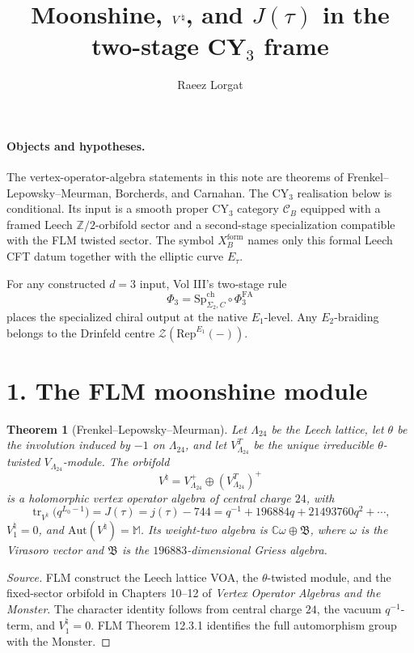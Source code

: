 \documentclass[11pt]{article}
\title{Moonshine, \(\Vnat\), and \(J(\tau)\) in the two-stage CY\(_3\) frame}
\author{Raeez Lorgat}
\date{}
\providecommand{\Z}{\mathbb{Z}}
\providecommand{\C}{\mathbb{C}}
\providecommand{\Leech}{\Lambda_{24}}
\providecommand{\Vnat}{V^{\natural}}
\providecommand{\VLam}{V_{\Leech}}
\providecommand{\Mon}{\mathbb{M}}
\providecommand{\Aut}{\mathrm{Aut}}
\providecommand{\SpCh}{\mathrm{Sp}^{\mathrm{ch}}}
\providecommand{\PhiFA}{\Phi^{\mathrm{FA}}}
\providecommand{\Tr}{\operatorname{tr}}
\providecommand{\Rep}{\mathrm{Rep}}
\theoremstyle{plain}
\newtheorem{theorem}{Theorem}
\theoremstyle{definition}
\begin{document}
\maketitle

\paragraph{Objects and hypotheses.}
The vertex-operator-algebra statements in this note are theorems of
Frenkel--Lepowsky--Meurman, Borcherds, and Carnahan. The CY\(_3\)
realisation below is conditional. Its input is a smooth proper CY\(_3\)
category \(\mathcal C_B\) equipped with a framed Leech
\(\Z/2\)-orbifold sector and a second-stage specialization compatible
with the FLM twisted sector. The symbol \(X_B^{\mathrm{form}}\) names
only this formal Leech CFT datum together with the elliptic curve
\(E_\tau\).

For any constructed \(d=3\) input, Vol III's two-stage rule
\[
  \Phi_3=\SpCh_{\Sigma_2,C}\circ\PhiFA_3
\]
places the specialized chiral output at the native \(E_1\)-level. Any
\(E_2\)-braiding belongs to the Drinfeld centre
\(\mathcal Z(\Rep^{E_1}(-))\).

\section*{1. The FLM moonshine module}

\begin{theorem}[Frenkel--Lepowsky--Meurman]
\label{thm:flm-vnatural}
Let \(\Leech\) be the Leech lattice, let \(\theta\) be the involution
induced by \(-1\) on \(\Leech\), and let \(\VLam^T\) be the unique
irreducible \(\theta\)-twisted \(\VLam\)-module. The orbifold
\[
  \Vnat=\VLam^{+}\oplus(\VLam^T)^{+}
\]
is a holomorphic vertex operator algebra of central charge \(24\), with
\[
  \Tr_{\Vnat}\bigl(q^{L_0-1}\bigr)
  =J(\tau)=j(\tau)-744
  =q^{-1}+196884q+21493760q^2+\cdots ,
\]
\(\Vnat_1=0\), and \(\Aut(\Vnat)=\Mon\). Its weight-two algebra is
\(\C\omega\oplus\mathfrak B\), where \(\omega\) is the Virasoro vector
and \(\mathfrak B\) is the \(196883\)-dimensional Griess algebra.
\end{theorem}

\begin{proof}[Source]
FLM construct the Leech lattice VOA, the \(\theta\)-twisted module, and
the fixed-sector orbifold in Chapters 10--12 of \emph{Vertex Operator
Algebras and the Monster}. The character identity follows from central
charge \(24\), the vacuum \(q^{-1}\)-term, and \(\Vnat_1=0\). FLM
Theorem 12.3.1 identifies the full automorphism group with the Monster.
\end{proof}
\end{document}
